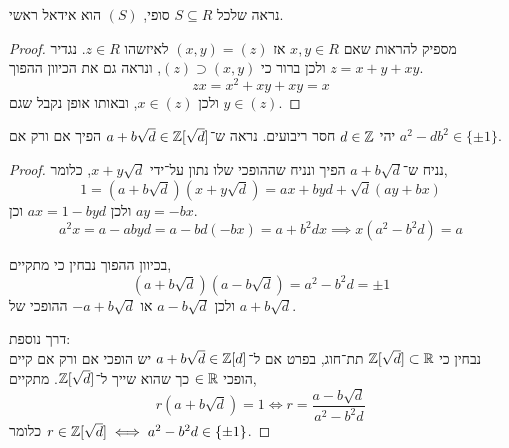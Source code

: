 \subquestion{}
נראה שלכל $S \subseteq R$ סופי, $(S)$ הוא אידאל ראשי.
\begin{proof}
	מספיק להראות שאם $x, y \in R$ אז $(x, y) = (z)$ לאיזשהו $z \in R$.
	נגדיר $z = x + y + x y$ ולכן ברור כי $(z) \supset (x, y)$, ונראה גם את הכיוון ההפוך.
	\[
		z x
		= x^2 + x y + x y
		= x
	\]
	ולכן $x \in (z)$, ובאותו אופן נקבל שגם $y \in (z)$.
\end{proof}

\question{}
יהי $d \in \mathbb{Z}$ חסר ריבועים.
נראה ש־$a + b \sqrt{d} \in \mathbb{Z}[\sqrt{d}]$ הפיך אם ורק אם $a^2 - d b^2 \in \{ \pm 1 \}$.
\begin{proof}
	נניח ש־$a + b \sqrt{d}$ הפיך ונניח שההופכי שלו נתון על־ידי $x + y \sqrt{d}$, כלומר,
	\[
		1
		= (a + b \sqrt{d})(x + y \sqrt{d})
		= a x + b y d + \sqrt{d} (a y + b x)
	\]
	ולכן $a x = 1 - b y d$ וכן $a y = - b x$.
	\[
		a^2 x
		= a - a b y d
		= a - b d (-b x)
		= a + b^2 d x
		\implies x (a^2 - b^2 d)
		= a
	\]

	בכיוון ההפוך נבחין כי מתקיים,
	\[
		(a + b \sqrt{d})(a - b \sqrt{d})
		= a^2 - b^2 d
		= \pm 1
	\]
	ולכן $a - b \sqrt{d}$ או $-a + b \sqrt{d}$ ההופכי של $a + b \sqrt{d}$.

	דרך נוספת: \\
	נבחין כי $\mathbb{Z}[\sqrt{d}] \subset \mathbb{R}$ תת־חוג, בפרט אם ל־$a + b \sqrt{d} \in \mathbb{Z}[d]$ יש הופכי אם ורק אם קיים הופכי $\in \mathbb{R}$ כך שהוא שייך ל־$\mathbb{Z}[\sqrt{d}]$.
	מתקיים,
	\[
		r (a + b \sqrt{d}) = 1
		\iff
		r = \frac{a - b \sqrt{d}}{a^2 - b^2 d}
	\]
	כלומר $r \in \mathbb{Z}[\sqrt{d}] \iff a^2 - b^2 d \in \{ \pm 1 \}$.
\end{proof}


